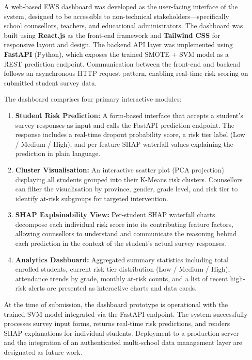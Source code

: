 A web-based EWS dashboard was developed as the user-facing interface of the system, designed to be accessible to non-technical stakeholders---specifically school counsellors, teachers, and educational administrators. The dashboard was built using \textbf{React.js} as the front-end framework and \textbf{Tailwind CSS} for responsive layout and design. The backend API layer was implemented using \textbf{FastAPI} (Python), which exposes the trained SMOTE + SVM model as a REST prediction endpoint. Communication between the front-end and backend follows an asynchronous HTTP request pattern, enabling real-time risk scoring on submitted student survey data.

The dashboard comprises four primary interactive modules:
\begin{enumerate}
    \item \textbf{Student Risk Prediction:} A form-based interface that accepts a student's survey responses as input and calls the FastAPI prediction endpoint. The response includes a real-time dropout probability score, a risk tier label (Low / Medium / High), and per-feature SHAP waterfall values explaining the prediction in plain language.
    \item \textbf{Cluster Visualisation:} An interactive scatter plot (PCA projection) displaying all students grouped into their K-Means risk clusters. Counsellors can filter the visualisation by province, gender, grade level, and risk tier to identify at-risk subgroups for targeted intervention.
    \item \textbf{SHAP Explainability View:} Per-student SHAP waterfall charts decompose each individual risk score into its contributing feature factors, allowing counsellors to understand and communicate the reasoning behind each prediction in the context of the student's actual survey responses.
    \item \textbf{Analytics Dashboard:} Aggregated summary statistics including total enrolled students, current risk tier distribution (Low / Medium / High), attendance trends by grade, monthly at-risk counts, and a list of recent high-risk alerts are presented as interactive charts and data cards.
\end{enumerate}

At the time of submission, the dashboard prototype is operational with the trained SVM model integrated via the FastAPI endpoint. The system successfully processes survey input forms, returns real-time risk predictions, and renders SHAP explanations for individual students. Deployment to a production server and the integration of an authenticated multi-school data management layer are designated as future work.
